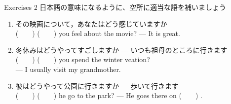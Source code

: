 \documentclass[aspectratio=169,xcolor={dvipsnames,table}]{beamer}
\begin{document}
\begin{frame}[plain]{Exercises 2}
 日本語の意味になるように、空所に適当な語を補いましょう
\begin{enumerate}
 \item {\small その映画について，あなたはどう感じていますか}\\
       (~~~~)  (~~~~)  you feel about the movie? --- It is great.
 \item {\small 冬休みはどうやってすごしますか --- いつも祖母のところに行きます}\\
       (~~~~)  (~~~~)  you spend the winter vcation?\\
 --- I usually visit my grandmother.
 \item {\small 彼はどうやって公園に行きますか --- 歩いて行きます}\\
       (~~~~)  (~~~~)  he go to the park? --- He goes there on  (~~~~) .
\end{enumerate}

\mbox{}\hfill{}

\hfill{\scriptsize {}}

\end{frame}
\end{document}
